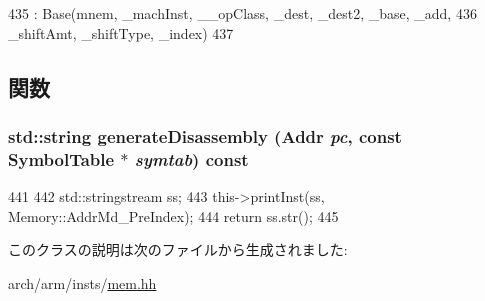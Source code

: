 \begin{DoxyCode}
435         : Base(mnem, _machInst, __opClass, _dest, _dest2, _base, _add,
436                 _shiftAmt, _shiftType, _index)
437     {}
\end{DoxyCode}


\subsection{関数}
\hypertarget{classArmISA_1_1MemoryPreIndex_a95d323a22a5f07e14d6b4c9385a91896}{
\subsubsection[{generateDisassembly}]{\setlength{\rightskip}{0pt plus 5cm}std::string generateDisassembly ({\bf Addr} {\em pc}, \/  const SymbolTable $\ast$ {\em symtab}) const}}
\label{classArmISA_1_1MemoryPreIndex_a95d323a22a5f07e14d6b4c9385a91896}



\begin{DoxyCode}
441     {
442         std::stringstream ss;
443         this->printInst(ss, Memory::AddrMd_PreIndex);
444         return ss.str();
445     }
\end{DoxyCode}


このクラスの説明は次のファイルから生成されました:\begin{DoxyCompactItemize}
\item 
arch/arm/insts/\hyperlink{arm_2insts_2mem_8hh}{mem.hh}\end{DoxyCompactItemize}
